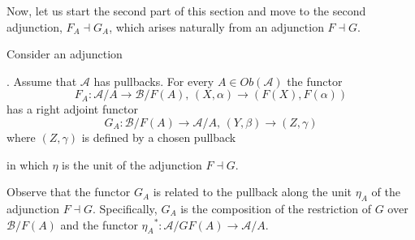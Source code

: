 Now, let us start the second part of this section and move to the second adjunction, $F_A\dashv G_A$, which arises naturally from an adjunction $F\dashv G$.

\begin{lemma}
\label{lem:AdjointSpecialization}
    Consider an adjunction
    . Assume that $\mathcal{A}$ has pullbacks. For every $A\in Ob(\mathcal{A})$ the functor    
    \begin{equation*}
        F_A:\mathcal{A}/A \longrightarrow \mathcal{B}/F(A)\text{, } (X,\alpha)\to (F(X), F(\alpha))
    \end{equation*}
    has a right adjoint functor
    \begin{equation*}
        G_A:\mathcal{B}/F(A) \longrightarrow \mathcal{A}/A\text{, } (Y,\beta)\to (Z, \gamma)
    \end{equation*}
    where $(Z,\gamma)$ is defined by a chosen pullback
    \begin{center}
    \end{center}
    in which $\eta$ is the unit of the adjunction $F\dashv G$.

    \begin{oss*}
        Observe that the functor $G_A$ is related to the pullback along the unit $\eta_A$ of the adjunction $F\dashv G$. Specifically, $G_A$ is the composition of the restriction of $G$ over $\mathcal{B}/F(A)$ and the functor ${\eta_A}^*:\mathcal{A}/GF(A)\longrightarrow \mathcal{A}/A$.
    \end{oss*}


\end{lemma}
